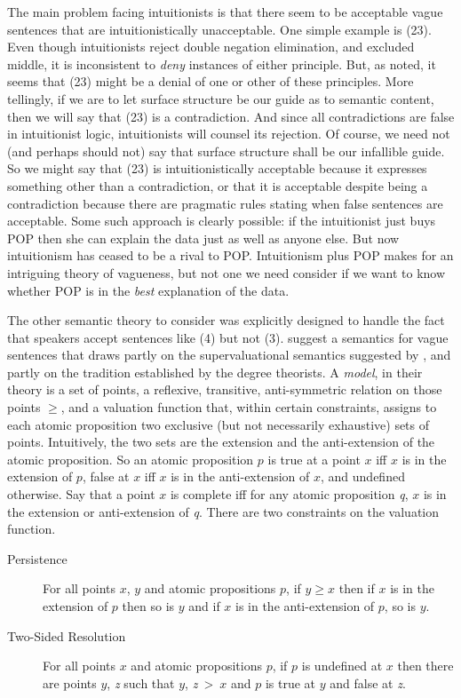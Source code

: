 The main problem facing intuitionists is that there seem to be acceptable vague sentences that are intuitionistically unacceptable. One simple example is (23). Even though intuitionists reject double negation elimination, and excluded middle, it is inconsistent to \textit{deny} instances of either principle. But, as noted, it seems that (23) might be a denial of one or other of these principles. More tellingly, if we are to let surface structure be our guide as to semantic content, then we will say that (23) is a contradiction. And since all contradictions are false in intuitionist logic, intuitionists will counsel its rejection. Of course, we need not (and perhaps should not) say that surface structure shall be our infallible guide. So we might say that (23) is intuitionistically acceptable because it expresses something other than a contradiction, or that it is acceptable despite being a contradiction because there are pragmatic rules stating when false sentences are acceptable. Some such approach is clearly possible: if the intuitionist just buys POP then she can explain the data just as well as anyone else. But now intuitionism has ceased to be a rival to POP. Intuitionism plus POP makes for an intriguing theory of vagueness, but not one we need consider if we want to know whether POP is in the \textit{best} explanation of the data.

The other semantic theory to consider was explicitly designed to handle the fact that speakers accept sentences like (4) but not (3). \citet{Burgess1987} suggest a semantics for vague sentences that draws partly on the supervaluational semantics suggested by \citet{Fine1975a}, and partly on the tradition established by the degree theorists. A \textit{model}, in their theory is a set of points, a reflexive, transitive, anti-symmetric relation on those points \(\geq\), and a valuation function that, within certain constraints, assigns to each atomic proposition two exclusive (but not necessarily exhaustive) sets of points. Intuitively, the two sets are the extension and the anti-extension of the atomic proposition. So an atomic proposition \(p\) is true at a point \(x\) iff \(x\) is in the extension of \(p\), false at \(x\) iff \(x\) is in the anti-extension of \(x\), and undefined otherwise. Say that a point \(x\) is complete iff for any atomic proposition \textit{q}, \(x\) is in the extension or anti-extension of \textit{q}. There are two constraints on the valuation function.

\begin{description}
\item[Persistence] For all points \(x\), \(y\) and atomic propositions \(p\), if \(y \geq x\) then if \(x\) is in the extension of \(p\) then so is \(y\) and if \(x\) is in the anti-extension of \(p\), so is \(y\).
\item[Two-Sided Resolution] For all points \(x\) and atomic propositions \(p\), if \(p\) is undefined at \(x\) then there are points \(y\), \textit{z} such that \(y\), \textit{z}~{\textgreater}~\(x\) and \(p\) is true at \(y\) and false at \textit{z}.
\end{description}

